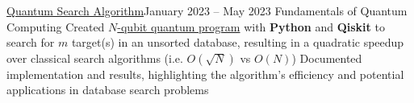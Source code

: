 
\subheading
    {\href{https://blog.lynkos.dev/posts/grover-full}{Quantum Search Algorithm}}{January 2023 -- May 2023}
    {Fundamentals of Quantum Computing}{}
    \itemListStart
    \listItem{}
        {Created \href{https://github.com/lynkos/grovers-algorithm}{$N$-qubit quantum program} with \textbf{Python} and \textbf{Qiskit} to search for $m$ target(s) in an unsorted database, resulting in a quadratic speedup over classical search algorithms (i.e. $O(\sqrt{N})$ vs $O(N)$)}
    \listItem{}
        {Documented implementation and results, highlighting the algorithm's efficiency and potential applications in database search problems}
    \itemListEnd